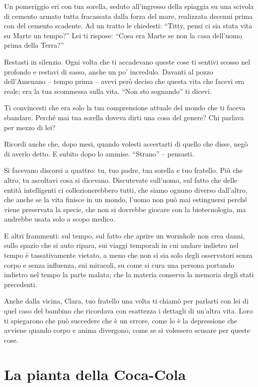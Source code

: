 Un pomeriggio eri con tua sorella, seduto all'ingresso della spiaggia su una scivola di cemento armato tutta fracassata dalla forza del mare, realizzata decenni prima con del cemento scadente. Ad un tratto le chiedesti: “Titty, pensi ci sia stata vita su Marte un tempo?” Lei ti rispose: “Cosa era Marte se non la casa dell'uomo prima della Terra?”

Restasti in silenzio. Ogni volta che ti accadevano queste cose ti sentivi scosso nel profondo e restavi di sasso, anche un po' incredulo. Davanti al pozzo dell'Amenano -- tempo prima -- avevi però deciso che questa vita che facevi era reale; era la tua scommessa sulla vita. “Non sto sognando” ti dicevi.

Ti convincesti che era solo la tua comprensione attuale del mondo che ti faceva sbandare. Perché mai tua sorella doveva dirti una cosa del genere? Chi parlava per mezzo di lei?

Ricordi anche che, dopo mesi, quando volesti accertarti di quello che disse, negò di averlo detto. E subito dopo lo ammise. “Strano” -- pensasti.

Si facevano discorsi a quattro: tu, tuo padre, tua sorella e tuo fratello. Più che altro, tu ascoltavi cosa si dicevano. Discutevate sull'uomo, sul fatto che delle entità intelligenti ci collezionerebbero tutti, che siamo ognuno diverso dall'altro, che anche se la vita finisce in un mondo, l'uomo non può mai estinguersi perché viene preservata la specie, che non si dovrebbe giocare con la biotecnologia, ma andrebbe usata solo a scopo medico.

E altri frammenti: sul tempo, sul fatto che aprire un wormhole non crea danni, sullo spazio che si auto ripara, sui viaggi temporali in cui andare indietro nel tempo è tassativamente vietato, a meno che non si sia solo degli osservatori senza corpo e senza influenza, sui miracoli, su come si cura una persona portando indietro nel tempo la parte malata; che la materia conserva la memoria degli stati precedenti.

Anche dalla vicina, Clara, tuo fratello una volta ti chiamò per parlarti con lei di quel caso del bambino che ricordava con esattezza i dettagli di un'altra vita. Loro ti spiegarono che può succedere che è un errore, come lo è la depressione che avviene quando corpo e anima divergono, come se si volessero scusare per queste cose.%

\section{La pianta della Coca-Cola}
\label{pianta_della_coca_cola}

